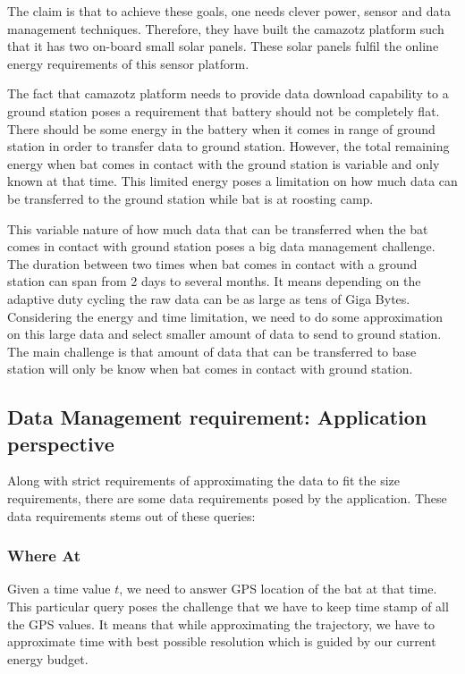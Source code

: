 \documentclass[conference]{IEEEtran}
\begin{document}
The claim is that to achieve these goals, one needs clever power, sensor and data management techniques. Therefore, they have built the camazotz platform such that it has two on-board small solar panels. These solar panels fulfil the online energy requirements of this sensor platform\cite{raja-ipsn}.\

The fact that camazotz platform needs to provide data download capability to a ground station poses a requirement that battery should not be completely flat. There should be some energy in the battery when it comes in range of ground station in order to transfer data to ground station. However, the total remaining energy when bat comes in contact with the ground station is variable and only known at that time. This limited energy poses a limitation on how much data can be transferred to the ground station while bat is at roosting camp.\

This variable nature of how much data that can be transferred when the bat comes in contact with ground station poses a big data management challenge. The duration between two times when bat comes in contact with a ground station can span from 2 days to several months\cite{raja-ipsn}. It means depending on the adaptive duty cycling the raw data can be as large as tens of Giga Bytes. Considering the energy and time limitation, we need to do some approximation on this large data and select smaller amount of data to send to ground station. The main challenge is that amount of data that can be transferred to base station will only be know when bat comes in contact with ground station.\

\subsection{Data Management requirement: Application perspective}
Along with strict requirements of approximating the data to fit the size requirements, there are some data requirements posed by the application. These data requirements stems out of these queries:
\subsubsection{Where At}
Given a time value $t$, we need to answer GPS location of the bat at that time. This particular query poses the challenge that we have to keep time stamp of all the GPS values. It means that while approximating the trajectory, we have to approximate time with best possible resolution which is guided by our current energy budget.
\end{document}

